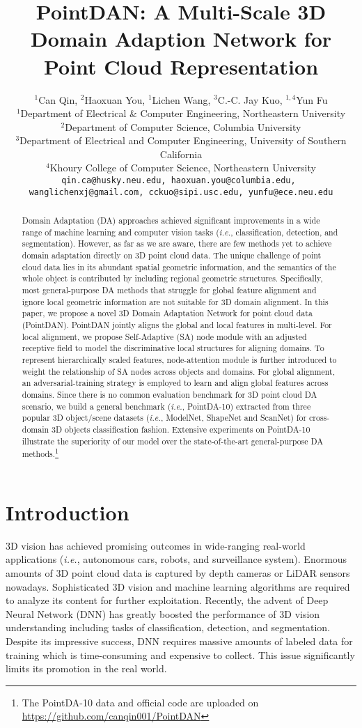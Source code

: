 \documentclass{article}
\title{PointDAN: A Multi-Scale 3D Domain Adaption Network for Point Cloud Representation}
\author{
    $^1$Can Qin\footnotemark[1], $^2$Haoxuan You\footnotemark[1], $^1$Lichen Wang, $^3$C.-C. Jay Kuo, $^{1,4}$Yun Fu \\
    $^1$Department of Electrical \& Computer Engineering, Northeastern University\\
    $^2$Department of Computer Science, Columbia University\\
    $^3$Department of Electrical and Computer Engineering, University of Southern California\\
    $^4$Khoury College of Computer Science, Northeastern University\\
    \texttt{qin.ca@husky.neu.edu, haoxuan.you@columbia.edu, }\\ \texttt{wanglichenxj@gmail.com, cckuo@sipi.usc.edu, yunfu@ece.neu.edu}\\
}
\newcommand*\ie{\textit{i.e.}}
\begin{document}
\maketitle

\begin{abstract}

Domain Adaptation (DA) approaches achieved significant improvements in a wide range of machine learning and computer vision tasks (\ie, classification, detection, and segmentation). However, as far as we are aware, there are few methods yet to achieve domain adaptation directly on 3D point cloud data. The unique challenge of point cloud data lies in its abundant spatial geometric information, and the semantics of the whole object is contributed by including regional geometric structures.  Specifically, most general-purpose DA methods that struggle for global feature alignment and ignore local geometric information are not suitable for 3D domain alignment. In this paper, we propose a novel 3D Domain Adaptation Network for point cloud data (PointDAN). PointDAN jointly aligns the global and local features in multi-level. For local alignment, we propose Self-Adaptive (SA) node module with an adjusted receptive field to model the discriminative local structures for aligning domains. To represent hierarchically scaled features, node-attention module is further introduced to weight the relationship of SA nodes across objects and domains. For global alignment, an adversarial-training strategy is employed to learn and align global features across domains. Since there is no common evaluation benchmark for 3D point cloud DA scenario, we build a general benchmark (\textit{i.e.}, PointDA-10) extracted from three popular 3D object/scene datasets (\textit{i.e.}, ModelNet, ShapeNet and ScanNet) for cross-domain 3D objects classification fashion. Extensive experiments on PointDA-10 illustrate the superiority of our model over the state-of-the-art general-purpose DA methods.\footnote{The PointDA-10 data and official code are uploaded on \url{https://github.com/canqin001/PointDAN}}
\end{abstract}

\renewcommand{\thefootnote}{\fnsymbol{footnote}}


\section{Introduction}\label{intro}
3D vision has achieved promising outcomes in wide-ranging real-world applications (\ie, autonomous cars, robots, and surveillance system). Enormous amounts of 3D point cloud data is captured by depth cameras or LiDAR sensors nowadays. Sophisticated 3D vision and machine learning algorithms are required to analyze its content for further exploitation. Recently, the advent of Deep Neural Network (DNN) has greatly boosted the performance of 3D vision understanding including tasks of classification, detection, and segmentation\cite{qi2017pointnet,feng2018gvcnn,  you2019pvrnet,zhou2018voxelnet}. Despite its impressive success, DNN requires massive amounts of labeled data for training which is time-consuming and expensive to collect. This issue significantly limits its promotion in the real world.
\end{document}
